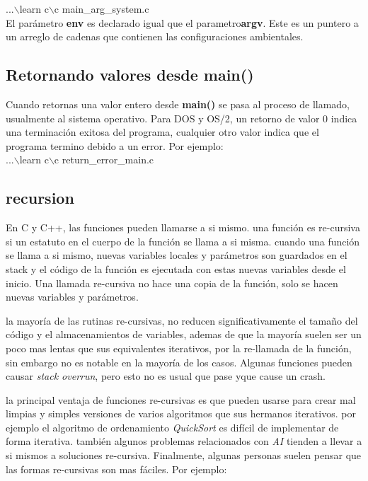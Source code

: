 \documentclass[]{article}
\begin{document}
	...$\backslash$learn c$\backslash$c main\_arg\_system.c\\
	
	El parámetro \textbf{env} es declarado igual que el parametro\textbf{argv}. Este es un puntero a un arreglo de cadenas que contienen las configuraciones ambientales.
	
	\subsection{Retornando valores desde main()}
	
	Cuando retornas una valor entero desde \textbf{main()} se pasa al proceso de llamado, usualmente al sistema operativo. Para DOS y OS/2, un retorno de valor 0 indica una terminación exitosa del programa, cualquier otro valor indica que el programa termino debido a un error. Por ejemplo:\\
	
	...$\backslash$learn c$\backslash$c return\_error\_main.c\\
	
	\subsection{recursion}
	
	En C y C++, las funciones pueden llamarse a si mismo. una función es re-cursiva si un estatuto en el cuerpo de la función se llama a si misma. cuando una función se llama a si mismo, nuevas variables locales y parámetros son guardados en el stack y el código de la función es ejecutada con estas nuevas variables desde el inicio. Una llamada re-cursiva no hace una copia de la función, solo se hacen nuevas variables y parámetros.
	
	la mayoría de las rutinas re-cursivas, no reducen significativamente el tamaño del código y el almacenamientos de variables, ademas de que la mayoría suelen ser un poco mas lentas que sus equivalentes iterativos, por la re-llamada de la función, sin embargo no es notable en la mayoría de los casos. Algunas funciones pueden causar \textit{stack overrun}, pero esto no es usual que pase yque cause un crash.
	
	la principal ventaja  de funciones re-cursivas es que pueden usarse para crear mal limpias y simples versiones de varios algoritmos que sus hermanos iterativos. por ejemplo el algoritmo de ordenamiento \textit{QuickSort}  es difícil de implementar de forma iterativa. también algunos problemas relacionados con \textit{AI} tienden a llevar a si mismos a soluciones re-cursiva. Finalmente, algunas personas suelen pensar que las formas re-cursivas son mas fáciles. Por ejemplo:\\
	
\end{document}
